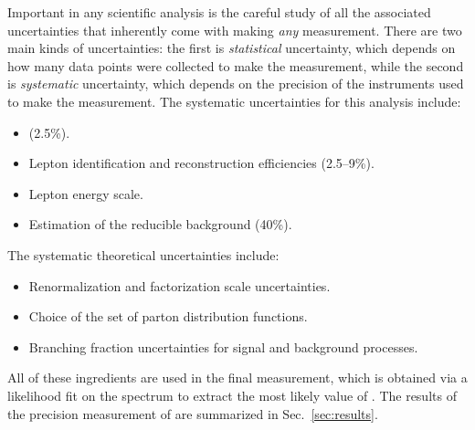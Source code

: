 Important in any scientific analysis is the careful study of all the associated uncertainties that inherently come with making \emph{any} measurement.
There are two main kinds of uncertainties:
the first is \emph{statistical} uncertainty, which depends on how many data points were collected to make the measurement,
while the second is \emph{systematic} uncertainty, which depends on the precision of the instruments used to make the measurement.
The systematic uncertainties for this analysis include:
\begin{itemize}
	\item \lumiint (2.5\%). %
	\item Lepton identification and reconstruction efficiencies (2.5--9\%). %
	\item Lepton energy scale. %
	\item Estimation of the reducible background (40\%). %
\end{itemize}
The systematic theoretical uncertainties include:
\begin{itemize}
	\item Renormalization and factorization scale uncertainties.  %
	\item Choice of the set of parton distribution functions. %
	\item Branching fraction uncertainties for signal and background processes. %
\end{itemize}

All of these ingredients are used in the final measurement, which is obtained via a likelihood fit on the \mH spectrum to extract the most likely value of \mH.
The results of the precision measurement of \mH are summarized in Sec.~\ref{sec:results}.




